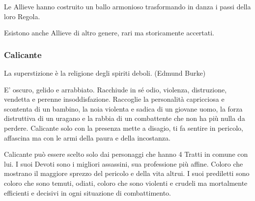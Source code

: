 \begin{multicols}{2}
Le Allieve hanno costruito un ballo armonioso trasformando in danza i passi della loro Regola.

Esistono anche Allieve di altro genere, rari ma storicamente accertati.

\subsubsection{Calicante}\label{calicante}\hypertarget{calicante}{}

\begin{enfasi}{
La superstizione è la religione degli spiriti deboli. (Edmund Burke)
}\end{enfasi}

E' oscuro, gelido e arrabbiato. Racchiude in sé odio, violenza, distruzione, vendetta e perenne insoddisfazione. Raccoglie la personalità capricciosa e scontenta di un bambino, la noia violenta e sadica di un giovane uomo, la forza distruttiva di un uragano e la rabbia di un combattente che non ha più nulla da perdere. Calicante solo con la presenza mette a disagio, ti fa sentire in pericolo, affascina ma con le armi della paura e della incostanza.

Calicante può essere scelto solo dai personaggi che hanno 4 Tratti in comune con lui. I suoi Devoti sono i migliori assassini, sua professione più affine. Coloro che mostrano il maggiore sprezzo del pericolo e della vita altrui. I suoi prediletti sono coloro che sono temuti, odiati, coloro che sono violenti e crudeli ma mortalmente efficienti e decisivi in ogni situazione di combattimento.


\end{multicols}

